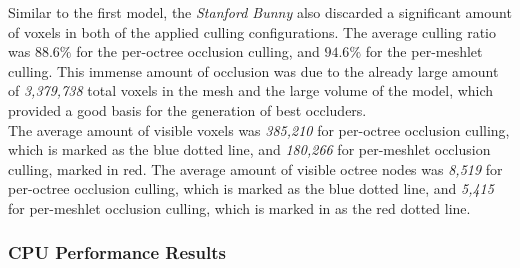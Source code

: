 \noindent
Similar to the first model, the \emph{Stanford Bunny} also discarded a significant amount of 
voxels in both of the applied culling configurations. The average culling ratio was $88.6\%$ 
for the per-octree occlusion culling, and $94.6\%$ for the per-meshlet culling. This immense 
amount of occlusion was due to the already large amount of \emph{3,379,738} total voxels in the 
mesh and the large volume of the model, which provided a good basis for the generation of best 
occluders. \\


\noindent
The average amount of visible voxels was \emph{385,210} for per-octree occlusion culling, which is 
marked as the blue dotted line, and \emph{180,266} for per-meshlet occlusion culling, marked in red.
The average amount of visible octree nodes was \emph{8,519} for per-octree occlusion culling, which is 
marked as the blue dotted line, and \emph{5,415} for per-meshlet occlusion culling, which is marked in 
as the red dotted line.

\subsubsection*{CPU Performance Results} \label{subsubsec-cpu-performance-results-bunny}


